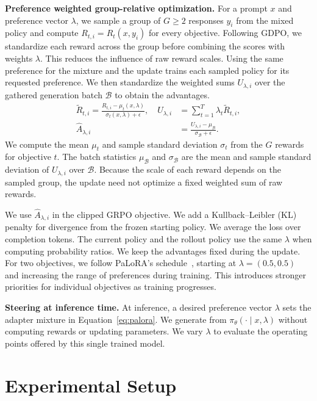 \documentclass{article} %
\begin{document}
\textbf{Preference weighted group-relative optimization.}
For a prompt $x$ and preference vector $\lambda$, we sample a group of $G\geq2$ responses $y_i$ from the mixed policy and compute $R_{t,i}=R_t(x,y_i)$ for every objective. Following GDPO, we standardize each reward across the group before combining the scores with weights $\lambda$. This reduces the influence of raw reward scales. Using the same preference for the mixture and the update trains each sampled policy for its requested preference. We then standardize the weighted sums $U_{\lambda,i}$ over the gathered generation batch $\mathcal B$ to obtain the advantages.
\begin{align}
  \widetilde R_{t,i}=\frac{R_{t,i}-\mu_t(x,\lambda)}
  {\sigma_t(x,\lambda)+\epsilon},
  \quad U_{\lambda,i}&=\sum_{t=1}^{T}\lambda_t\widetilde R_{t,i},
  \label{eq:advantage-on}\\
  \widehat A_{\lambda,i}
  &=\frac{U_{\lambda,i}-\mu_{\mathcal B}}{\sigma_{\mathcal B}+\epsilon}.  \label{eq:batch-advantage}
\end{align}
We compute the mean $\mu_t$ and sample standard deviation $\sigma_t$ from the $G$ rewards for objective $t$. The batch statistics $\mu_{\mathcal B}$ and $\sigma_{\mathcal B}$ are the mean and sample standard deviation of $U_{\lambda,i}$ over $\mathcal B$. Because the scale of each reward depends on the sampled group, the update need not optimize a fixed weighted sum of raw rewards.

We use $\widehat A_{\lambda,i}$ in the clipped GRPO objective. We add a Kullback--Leibler (KL) penalty for divergence from the frozen starting policy. We average the loss over completion tokens. The current policy and the rollout policy use the same $\lambda$ when computing probability ratios. We keep the advantages fixed during the update. For two objectives, we follow PaLoRA's schedule~\citep{dimitriadis2025palora}, starting at $\lambda=(0.5,0.5)$ and increasing the range of preferences during training. This introduces stronger priorities for individual objectives as training progresses.


\textbf{Steering at inference time.}
At inference, a desired preference vector $\lambda$ sets the adapter mixture in Equation~\ref{eq:palora}. We generate from $\pi_\theta(\cdot\mid x,\lambda)$ without computing rewards or updating parameters. We vary $\lambda$ to evaluate the operating points offered by this single trained model.


\section{Experimental Setup}
\end{document}
